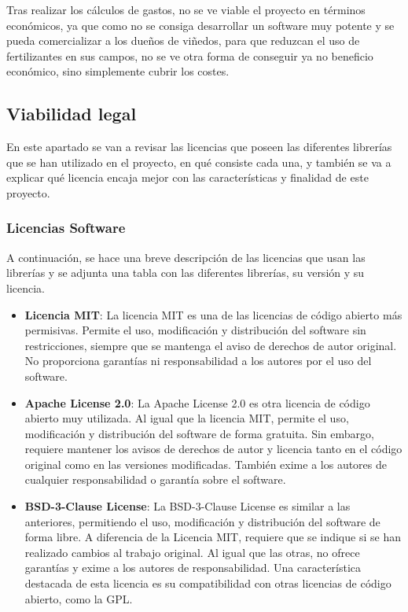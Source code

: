 Tras realizar los cálculos de gastos, no se ve viable el proyecto en términos económicos, ya que como no se consiga desarrollar un software muy potente y se pueda comercializar a los dueños de viñedos, para que reduzcan el uso de fertilizantes en sus campos, no se ve otra forma de conseguir ya no beneficio económico, sino simplemente cubrir los costes.

\subsection{Viabilidad legal}
En este apartado se van a revisar las licencias que poseen las diferentes librerías que se han utilizado en el proyecto, en qué consiste cada una, y también se va a explicar qué licencia encaja mejor con las características y finalidad de este proyecto.

\subsubsection{Licencias Software}
A continuación, se hace una breve descripción de las licencias que usan las librerías y se adjunta una tabla con las diferentes librerías, su versión y su licencia. 

\begin{itemize}
    \item \textbf{Licencia MIT}: La licencia MIT es una de las licencias de código abierto más permisivas. Permite el uso, modificación y distribución del software sin restricciones, siempre que se mantenga el aviso de derechos de autor original. No proporciona garantías ni responsabilidad a los autores por el uso del software.
	
    \item \textbf{Apache License 2.0}: La Apache License 2.0 es otra licencia de código abierto muy utilizada. Al igual que la licencia MIT, permite el uso, modificación y distribución del software de forma gratuita. Sin embargo, requiere mantener los avisos de derechos de autor y licencia tanto en el código original como en las versiones modificadas. También exime a los autores de cualquier responsabilidad o garantía sobre el software.
	
    \item \textbf{BSD-3-Clause License}: La BSD-3-Clause License es similar a las anteriores, permitiendo el uso, modificación y distribución del software de forma libre. A diferencia de la Licencia MIT, requiere que se indique si se han realizado cambios al trabajo original. Al igual que las otras, no ofrece garantías y exime a los autores de responsabilidad. Una característica destacada de esta licencia es su compatibilidad con otras licencias de código abierto, como la GPL.
	
\end{itemize}


